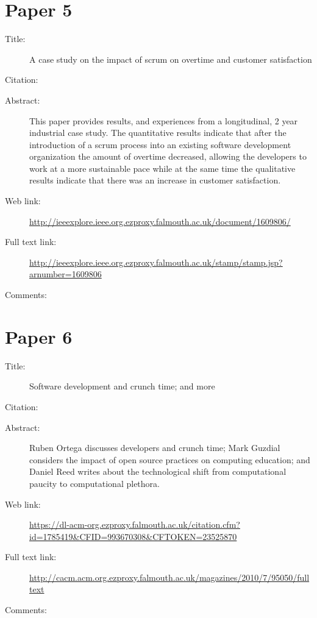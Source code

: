 \documentclass{scrartcl}
\begin{document}
\section*{Paper 5}
\begin{description}
\item[Title:]A case study on the impact of scrum on overtime and customer satisfaction
\item[Citation:] \cite{mann2005case}
\item[Abstract:]This paper provides results, and experiences from a longitudinal, 2 year industrial case study. The quantitative results indicate that after the introduction of a scrum process into an existing software development organization the amount of overtime decreased, allowing the developers to work at a more sustainable pace while at the same time the qualitative results indicate that there was an increase in customer satisfaction.
\item[Web link:]\url {http://ieeexplore.ieee.org.ezproxy.falmouth.ac.uk/document/1609806/}
\item[Full text link:] \url {http://ieeexplore.ieee.org.ezproxy.falmouth.ac.uk/stamp/stamp.jsp?arnumber=1609806}
\item[Comments:]
\end{description}

\section*{Paper 6}
\begin{description}
\item[Title:] Software development and crunch time; and more
\item[Citation:] \cite{onlineWebl}
\item[Abstract:]Ruben Ortega discusses developers and crunch time; Mark Guzdial considers the impact of open source practices on computing education; and Daniel Reed writes about the technological shift from computational paucity to computational plethora.
\item[Web link:] \url {https://dl-acm-org.ezproxy.falmouth.ac.uk/citation.cfm?id=1785419&CFID=993670308&CFTOKEN=23525870}
\item[Full text link:]\url { http://cacm.acm.org.ezproxy.falmouth.ac.uk/magazines/2010/7/95050/fulltext}
\item[Comments:] 
\end{description}
\end{document}
